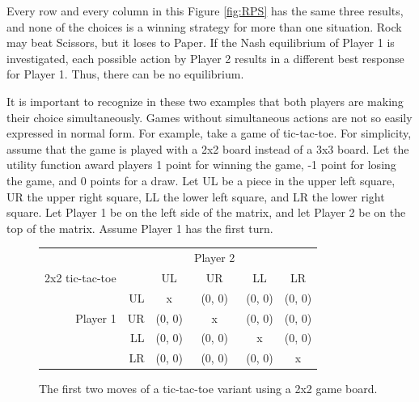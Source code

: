 Every row and every column in this Figure \ref{fig:RPS} has the same three results, and none of the choices is a winning strategy for more than one situation. Rock may beat Scissors, but it loses to Paper. If the Nash equilibrium of Player 1 is investigated, each possible action by Player 2 results in a different best response for Player 1. Thus, there can be no equilibrium.

It is important to recognize in these two examples that both players are making their choice simultaneously. Games without simultaneous actions are not so easily expressed in normal form. For example, take a game of tic-tac-toe. For simplicity, assume that the game is played with a 2x2 board instead of a 3x3 board. Let the utility function award players 1 point for winning the game, -1 point for losing the game, and 0 points for a draw. Let UL be a piece in the upper left square, UR the upper right square, LL the lower left square, and LR the lower right square. Let Player 1 be on the left side of the matrix, and let Player 2 be on the top of the matrix. Assume Player 1 has the first turn.\\
\begin{figure}[H]
  \centering
  \begin{tabular}{r r | c | c | c | c |}
    &\multicolumn{1}{c}{}&\multicolumn{1}{c}{}&\multicolumn{1}{c}{Player 2}&\multicolumn{1}{c}{}\\
    \multicolumn{1}{c}{2x2 tic-tac-toe}&\multicolumn{1}{c}{}&\multicolumn{1}{c}{UL}&
    \multicolumn{1}{c}{UR}&\multicolumn{1}{c}{LL}&\multicolumn{1}{c}{LR}\\ \cline{3-6}
    & UL & x & (0, 0) & (0, 0) & (0, 0) \\ \cline{3-6}
    Player 1 & UR & (0, 0) & x & (0, 0) & (0, 0) \\ \cline{3-6}
    & LL & (0, 0) & (0, 0) & x & (0, 0) \\ \cline{3-6}
    & LR & (0, 0) & (0, 0) & (0, 0) & x \\ \cline{3-6}
  \end{tabular}
  \caption{The first two moves of a tic-tac-toe variant using a 2x2 game board.}
  \label{fig:2x2TTT}
\end{figure}

